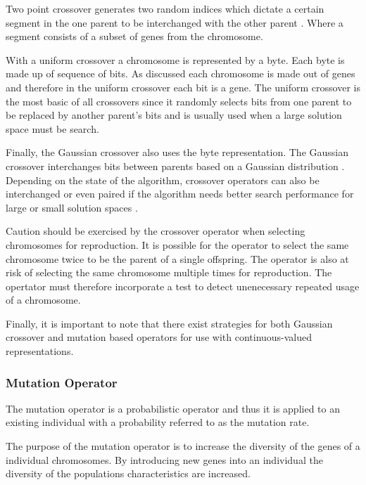 Two point crossover generates two random indices which dictate a certain segment in the one parent to be interchanged with the other parent \cite{ConstrainedGA}. Where a segment consists of a subset of genes from the chromosome. 

With a uniform crossover a chromosome is represented by a byte\cite{CompuIntelligenceIntro}. Each byte is made up of sequence of bits. As discussed each chromosome is made out of genes and therefore in the uniform crossover each bit is a gene\cite{CompuIntelligenceIntro}. The uniform crossover is the most basic of all crossovers since it randomly selects bits from one parent to be replaced by another parent's bits and is usually used when a large solution space must be search\cite{ParallelGASA,GeostatisticalGA}. 

Finally, the Gaussian crossover also uses the byte representation. The Gaussian crossover interchanges bits between parents based on a Gaussian distribution \cite{ParallelGASA,GeostatisticalGA}. Depending on the state of the algorithm, crossover operators can also be interchanged or even paired if the algorithm needs better search performance for large or small solution spaces \cite{HetergeneousGA,ParallelGASA}.

Caution should be exercised by the crossover operator when selecting chromosomes for reproduction. It is possible for the operator to select the same chromosome twice to be the parent of a single offspring\cite{CompuIntelligenceIntro}. The operator is also at risk of selecting the same chromosome multiple times for reproduction\cite{CompuIntelligenceIntro}. The opertator must therefore incorporate a test to detect unenecessary repeated usage of a chromosome\cite{CompuIntelligenceIntro}.

Finally, it is important to note that there exist strategies for both Gaussian crossover and mutation based operators for use with continuous-valued representations\cite{FundamentalSwarm}.

\subsubsection{Mutation Operator}
The mutation operator is a probabilistic operator and thus it is applied to an existing individual with a probability referred to as the mutation rate\cite{CompuIntelligenceIntro}. 

The purpose of the mutation operator is to increase the diversity of the genes of a individual chromosomes\cite{CompuIntelligenceIntro}. By introducing new genes into an individual the diversity of the populations characteristics are increased\cite{CoactiveFuzzyGA,AcceleratingGA,ConstrainedGA}.


